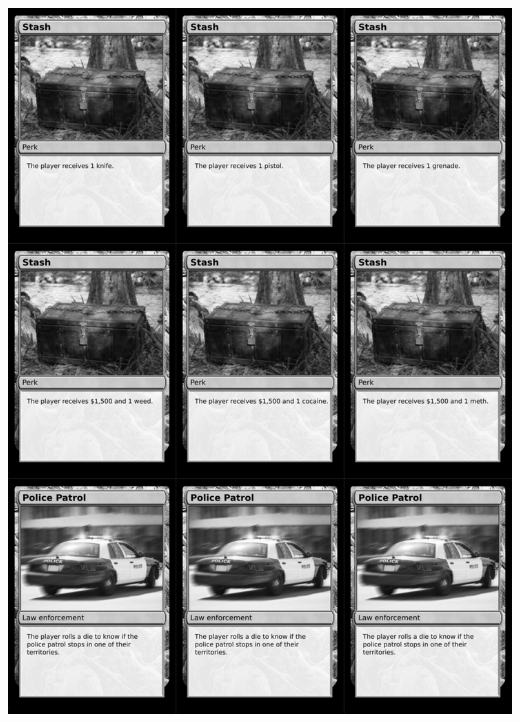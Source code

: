 \documentclass[a4paper]{article}
\begin{document}
\newpage

\begin{center}
	\centering
	\includegraphics[width=200.5mm,height=280.7mm]{output/temp/page30.png}
\end{center}
\end{document}
